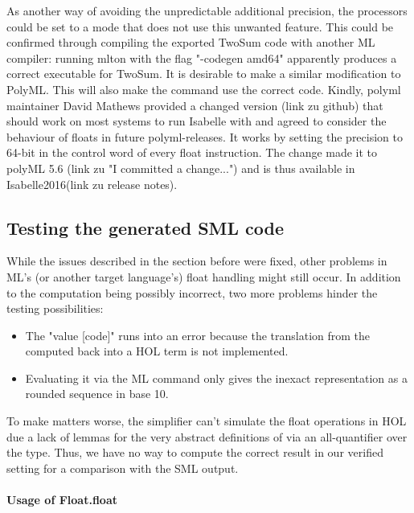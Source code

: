 \documentclass[11pt,a4paper]{article}
\begin{document}
As another way of avoiding the unpredictable additional precision, the processors could be set to a mode that does not use this unwanted feature. This could be confirmed through compiling the exported TwoSum code with another ML compiler: running mlton with the flag "-codegen amd64" apparently produces a correct executable for TwoSum. It is desirable to make a similar modification to PolyML. This will also make the
command use the correct code. Kindly, polyml maintainer David Mathews provided a changed version (link zu github) that should work on most systems to run Isabelle with and agreed to consider the behaviour of floats in future polyml-releases. It works by setting the precision to 64-bit in the control word of every float instruction. The change made it to polyML 5.6 (link zu "I committed a change...") and is thus available in Isabelle2016(link zu release notes).

\subsection {Testing the generated SML code}
While the issues described in the section before were fixed, other problems in ML's (or another target language's) float handling might still occur. In addition to the computation being possibly incorrect, two more problems hinder the testing possibilities:
\begin{itemize}
\item The "value [code]" runs into an error because the translation from the computed \MLreal back into a HOL term is not implemented.
\item Evaluating it via the ML command only gives the inexact representation as a rounded sequence in base 10.
\end{itemize}
To make matters worse, the simplifier can't simulate the float operations in HOL due a lack of lemmas for the very abstract definitions of
via an all-quantifier over the \HOLreal type. Thus, we have no way to compute the correct result in our verified setting for a comparison with the SML output.

\paragraph {Usage of Float.float}
\end{document}

